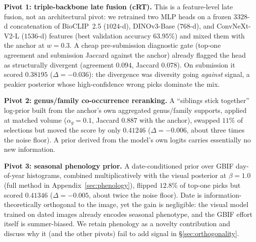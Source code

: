\textbf{Pivot 1: triple-backbone late fusion (cRT).} This is a feature-level late fusion, not an
architectural pivot: we retrained two MLP heads on a
frozen $3328$-d concatenation of BioCLIP~2.5 ($1024$-d), DINOv3-Base ($768$-d), and ConvNeXt-V2-L
($1536$-d) features (best validation accuracy $63.95\%$) and mixed them with the anchor at $w{=}0.3$. A cheap pre-submission diagnostic
gate (top-one agreement and submission Jaccard against the anchor) already flagged the head
as structurally divergent (agreement $0.094$, Jaccard $0.078$). On submission it scored
$\mathbf{0.38195}$ ($\Delta{=}{-}0.036$): the divergence was diversity going \emph{against} signal,
a peakier posterior whose high-confidence wrong picks dominate the mix.

\textbf{Pivot 2: genus/family co-occurrence reranking.} A ``siblings stick together'' log-prior
built from the anchor's own aggregated genus/family supports, applied at matched volume
($\alpha_g{=}0.1$, Jaccard $0.887$ with the anchor), swapped $11\%$ of selections but moved the
score by only $\mathbf{0.41246}$ ($\Delta{=}{-}0.006$, about three times the noise floor). A prior derived
from the model's own logits carries essentially no new information.

\textbf{Pivot 3: seasonal phenology prior.} A date-conditioned prior over GBIF day-of-year
histograms, combined multiplicatively with the visual posterior at $\beta{=}1.0$ (full method in
Appendix~\ref{sec:phenology}), flipped $12.8\%$ of top-one picks but scored $\mathbf{0.41346}$
($\Delta{=}{-}0.005$, about twice the noise floor). Date is information-theoretically orthogonal to the
image, yet the gain is negligible: the visual model trained on dated images already encodes
seasonal phenotype, and the GBIF effort itself is summer-biased. We retain phenology as a novelty
contribution and discuss why it (and the other pivots) fail to add signal in \S\ref{sec:orthogonality}.

